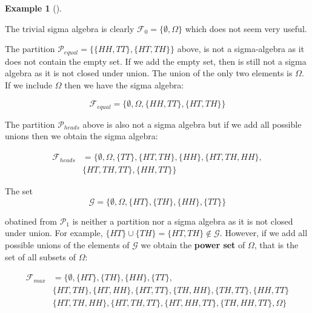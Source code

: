 \documentclass[
  letterpaper,
  DIV=11,
  numbers=noendperiod]{scrreport}
\theoremstyle{definition}
\newtheorem{example}{Example}[chapter]
\theoremstyle{plain}
\theoremstyle{definition}
\theoremstyle{plain}
\theoremstyle{remark}
\begin{document}
\begin{tcolorbox}[enhanced jigsaw, breakable, opacityback=0, leftrule=.75mm, colback=white, bottomtitle=1mm, coltitle=black, toptitle=1mm, titlerule=0mm, bottomrule=.15mm, colframe=quarto-callout-note-color-frame, title={Examples of sigma-algebras}, opacitybacktitle=0.6, colbacktitle=quarto-callout-note-color!10!white, rightrule=.15mm, arc=.35mm, toprule=.15mm, left=2mm]

\begin{example}[]\protect\hypertarget{exm-sigma-algebra}{}\label{exm-sigma-algebra}

The trivial sigma algebra is clearly
\(\mathcal F_0=\{\emptyset, \Omega\}\) which does not seem very useful.

The partition \(\mathcal P_{equal}=\{\{HH,TT\}, \{HT,TH\}\}\) above, is
not a sigma-algebra as it does not contain the empty set. If we add the
empty set, then is still not a sigma algebra as it is not closed under
union. The union of the only two elements is \(\Omega\). If we include
\(\Omega\) then we have the sigma algebra:

\[
\mathcal F_{equal}=\{\emptyset, \Omega, \{HH,TT\}, \{HT,TH\}\}
\]

The partition \(\mathcal P_{heads}\) above is also not a sigma algebra
but if we add all possible unions then we obtain the sigma algebra:

\[
\begin{aligned}
\mathcal F_{heads}& =\{\emptyset, \Omega, \{TT\}, \{HT,TH\}, \{HH\}, \{HT,TH,HH\},\\
 & \{HT,TH,TT\}, \{HH,TT\}\}
\end{aligned}
\]

The set \[
\mathcal G =\{\emptyset,\Omega,\{HT\},\{TH\},\{HH\},\{TT\}\}
\]

obatined from \(\mathcal P_1\) is neither a partition nor a sigma
algebra as it is not closed under union. For example,
\(\{HT\}\cup \{TH\}=\{HT,TH\}\notin \mathcal G\). However, if we add all
possible unions of the elements of \(\mathcal G\) we obtain the
\textbf{power set} of \(\Omega\), that is the set of all subsets of
\(\Omega\):

\[
\begin{aligned}
\mathcal F_{max} &= \{\emptyset,  \{HT\},\{TH\},\{HH\},\{TT\},\\
&  \{HT,TH\}, \{HT,HH\}, \{HT,TT\}, \{TH,HH\}, \{TH,TT\}, \{HH,TT\}\\
&  \{HT,TH,HH\}, \{HT,TH,TT\}, \{HT,HH,TT\}, \{TH,HH,TT\},\Omega \}
\end{aligned}
\]


\end{example}
\end{tcolorbox}
\end{document}
